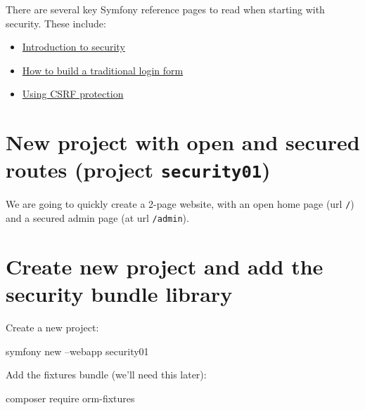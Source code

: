 \documentclass[a4paperpaper,openright]{book}
\newenvironment{Shaded}{}{}
\newcommand{\ExtensionTok}[1]{#1}
\newcommand{\NormalTok}[1]{#1}
\begin{document}
There are several key Symfony reference pages to read when starting with
security. These include:

\begin{itemize}
\item
  \href{https://symfony.com/doc/current/security.html}{Introduction to
  security}
\item
  \href{https://symfony.com/doc/current/security/form_login_setup.html}{How
  to build a traditional login form}
\item
  \href{https://symfony.com/doc/current/security/csrf.html}{Using CSRF
  protection}
\end{itemize}

\hypertarget{new-project-with-open-and-secured-routes-project-security01}{%
\section{\texorpdfstring{New project with open and secured routes
(project
\texttt{security01})}{New project with open and secured routes (project security01)}}\label{new-project-with-open-and-secured-routes-project-security01}}

We are going to quickly create a 2-page website, with an open home page
(url \texttt{/}) and a secured admin page (at url \texttt{/admin}).

\hypertarget{create-new-project-and-add-the-security-bundle-library}{%
\section{Create new project and add the security bundle
library}\label{create-new-project-and-add-the-security-bundle-library}}

Create a new project:

\begin{Shaded}
\begin{Highlighting}[]
  \ExtensionTok{symfony}\NormalTok{ new --webapp security01}
\end{Highlighting}
\end{Shaded}

Add the fixtures bundle (we'll need this later):

\begin{Shaded}
\begin{Highlighting}[]
    \ExtensionTok{composer}\NormalTok{ require orm-fixtures}
\end{Highlighting}
\end{Shaded}
\end{document}
